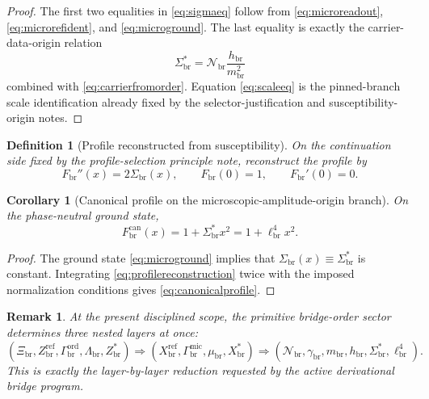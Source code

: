 \documentclass[11pt]{article}
\newcommand{\CurvScale}{\ell_{\mathrm{br}}}
\newcommand{\CurvProfile}{F_{\mathrm{br}}}
\newcommand{\CurvProfileCan}{F_{\mathrm{br}}^{\mathrm{can}}}
\newcommand{\RespSus}{\Sigma_{\mathrm{br}}}
\newcommand{\RespSusEq}{\Sigma_{\mathrm{br}}^{\ast}}
\newcommand{\RespNorm}{\mathcal N_{\mathrm{br}}}
\newcommand{\RespFluxCoeff}{\gamma_{\mathrm{br}}}
\newcommand{\RespGap}{m_{\mathrm{br}}}
\newcommand{\RespBias}{h_{\mathrm{br}}}
\newcommand{\RespMicroEq}{X_{\mathrm{br}}^{\ast}}
\newcommand{\RespMicroRef}{X_{\mathrm{br}}^{\mathrm{ref}}}
\newcommand{\RespMicroFluxCoeff}{\Gamma_{\mathrm{br}}^{\mathrm{mic}}}
\newcommand{\RespMicroGap}{\mu_{\mathrm{br}}}
\newcommand{\RespOrderRef}{Z_{\mathrm{br}}^{\mathrm{ref}}}
\newcommand{\RespOrderEq}{Z_{\mathrm{br}}^{\ast}}
\newcommand{\RespOrderReadout}{\Xi_{\mathrm{br}}}
\newcommand{\RespOrderStiff}{\Gamma_{\mathrm{br}}^{\mathrm{ord}}}
\newcommand{\RespOrderQuartic}{\Lambda_{\mathrm{br}}}
\newtheorem{definition}{Definition}
\newtheorem{remark}{Remark}
\newtheorem{corollary}{Corollary}
\begin{document}
\begin{proof}
The first two equalities in \eqref{eq:sigmaeq} follow from \eqref{eq:microreadout}, \eqref{eq:microrefident}, and \eqref{eq:microground}. The last equality is exactly the carrier-data-origin relation
\[
\RespSusEq=\RespNorm\frac{\RespBias}{\RespGap^2}
\]
combined with \eqref{eq:carrierfromorder}. Equation \eqref{eq:scaleeq} is the pinned-branch scale identification already fixed by the selector-justification and susceptibility-origin notes.
\end{proof}

\begin{definition}[Profile reconstructed from susceptibility]
\label{def:profilereconstruction}
On the continuation side fixed by the profile-selection principle note, reconstruct the profile by
\begin{equation}
\CurvProfile''(x)=2\RespSus(x),
\qquad
\CurvProfile(0)=1,
\qquad
\CurvProfile'(0)=0.
\label{eq:profilereconstruction}
\end{equation}
\end{definition}

\begin{corollary}[Canonical profile on the microscopic-amplitude-origin branch]
\label{cor:canonicalprofile}
On the phase-neutral ground state,
\begin{equation}
\CurvProfileCan(x)=1+\RespSusEq x^2=1+\CurvScale^4x^2.
\label{eq:canonicalprofile}
\end{equation}
\end{corollary}

\begin{proof}
The ground state \eqref{eq:microground} implies that \(\RespSus(x)\equiv\RespSusEq\) is constant. Integrating \eqref{eq:profilereconstruction} twice with the imposed normalization conditions gives \eqref{eq:canonicalprofile}.
\end{proof}

\begin{remark}
At the present disciplined scope, the primitive bridge-order sector determines three nested layers at once:
\[
(\RespOrderReadout,\RespOrderRef,\RespOrderStiff,\RespOrderQuartic,\RespOrderEq)
\Longrightarrow
(\RespMicroRef,\RespMicroFluxCoeff,\RespMicroGap,\RespMicroEq)
\Longrightarrow
(\RespNorm,\RespFluxCoeff,\RespGap,\RespBias,\RespSusEq,\CurvScale^4).
\]
This is exactly the layer-by-layer reduction requested by the active derivational bridge program.
\end{remark}
\end{document}
